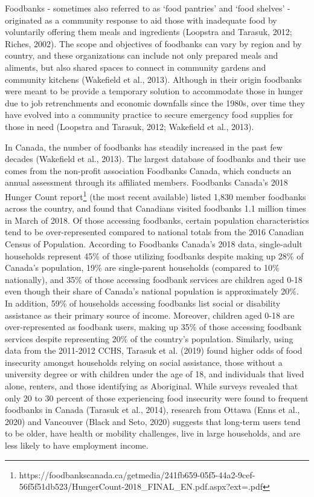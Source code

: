 \documentclass[]{elsarticle} %
\begin{document}
Foodbanks - sometimes also referred to as `food pantries' and `food
shelves' - originated as a community response to aid those with
inadequate food by voluntarily offering them meals and ingredients
(Loopstra and Tarasuk, 2012; Riches, 2002). The scope and objectives of
foodbanks can vary by region and by country, and these organizations can
include not only prepared meals and aliments, but also shared spaces to
connect in community gardens and community kitchens (Wakefield et al.,
2013). Although in their origin foodbanks were meant to be provide a
temporary solution to accommodate those in hunger due to job
retrenchments and economic downfalls since the 1980s, over time they
have evolved into a community practice to secure emergency food supplies
for those in need (Loopstra and Tarasuk, 2012; Wakefield et al., 2013).

In Canada, the number of foodbanks has steadily increased in the past
few decades (Wakefield et al., 2013). The largest database of foodbanks
and their use comes from the non-profit association Foodbanks Canada,
which conducts an annual assessment through its affiliated members.
Foodbanks Canada's 2018 Hunger Count report\footnote{https://foodbankscanada.ca/getmedia/241fb659-05f5-44a2-9cef-56f5f51db523/HungerCount-2018\_FINAL\_EN.pdf.aspx?ext=.pdf}
(the most recent available) listed 1,830 member foodbanks across the
country, and found that Canadians visited foodbanks 1.1 million times in
March of 2018. Of those accessing foodbanks, certain population
characteristics tend to be over-represented compared to national totals
from the 2016 Canadian Census of Population. According to Foodbanks
Canada's 2018 data, single-adult households represent 45\% of those
utilizing foodbanks despite making up 28\% of Canada's population, 19\%
are single-parent households (compared to 10\% nationally), and 35\% of
those accessing foodbank services are children aged 0-18 even though
their share of Canada's national population is approximately 20\%. In
addition, 59\% of households accessing foodbanks list social or
disability assistance as their primary source of income. Moreover,
children aged 0-18 are over-represented as foodbank users, making up
35\% of those accessing foodbank services despite representing 20\% of
the country's population. Similarly, using data from the 2011-2012 CCHS,
Tarasuk et al. (2019) found higher odds of food insecurity amongst
households relying on social assistance, those without a university
degree or with children under the age of 18, and individuals that lived
alone, renters, and those identifying as Aboriginal. While surveys
revealed that only 20 to 30 percent of those experiencing food
insecurity were found to frequent foodbanks in Canada (Tarasuk et al.,
2014), research from Ottawa (Enns et al., 2020) and Vancouver (Black and
Seto, 2020) suggests that long-term users tend to be older, have health
or mobility challenges, live in large households, and are less likely to
have employment income.
\end{document}
